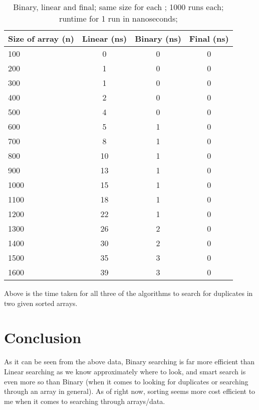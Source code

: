 \documentclass[a4paper,11pt]{article}
\begin{document}
\begin{table}[h]
\begin{center}
\begin{tabular}{l|c|c|c}
\textbf{Size of array (n)} & \textbf{Linear (ns)} & \textbf{Binary (ns)} & \textbf{Final (ns)}\\
\hline
  100     &  0 &     0 &     0\\
  200     &  1 &     0 &     0\\
  300     &  1 &     0 &     0\\
  400     &  2 &     0 &     0\\
  500     &  4 &     0 &     0\\
  600     &  5 &     1 &     0\\
  700     &  8 &     1 &     0\\
  800    &  10 &     1 &     0\\
  900    &  13 &     1 &     0\\
  1000     &  15 &     1 &    0\\
  1100     &  18 &     1 &    0\\
  1200     &  22 &     1 &    0\\
  1300     &  26 &     2 &    0\\
  1400     &  30 &     2 &    0\\
  1500     &  35&      3 &     0\\
  1600     &  39 &     3 &     0\\
\end{tabular}
\caption{Binary, linear and final; same size for each ; 1000 runs each;  runtime for 1 run in nanoseconds;}
\label{tab:table}
\end{center}
\end{table}

Above is the time taken for all three of the algorithms to search for duplicates in two given sorted arrays.


\section*{Conclusion}

As it can be seen from the above data, Binary searching is far more efficient than Linear searching as we know approximately where to look, and smart search is even more so than Binary (when it comes to looking for duplicates or searching through an array in general). As of right now, sorting seems more cost efficient to me when it comes to searching through arrays/data.
\end{document}
